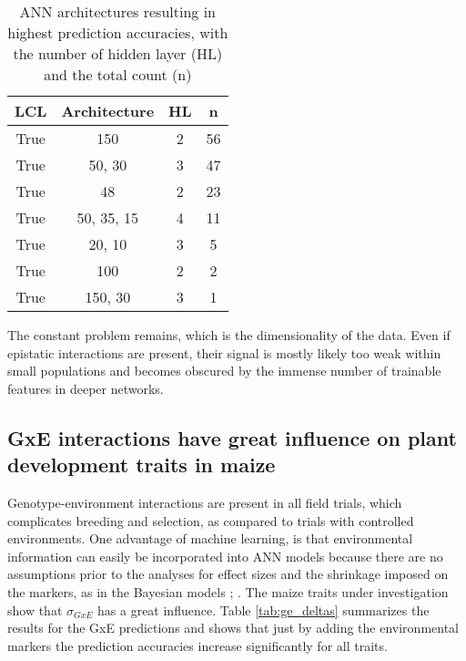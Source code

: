 \onehalfspacing
\begin{table}[H]
 \centering
 \caption[ANN architectures of ANN resulting in highest prediction accuracies]{ANN
   architectures resulting in highest prediction accuracies, with the number of hidden layer
   (HL) and the total count (n)}
 \begin{tabular}{cccc}
   \toprule
   LCL  & Architecture & HL & n  \\ 
   \midrule
   True & 150          & 2  & 56 \\ 
   True & 50, 30       & 3  & 47 \\ 
   True & 48           & 2  & 23 \\ 
   True & 50, 35, 15   & 4  & 11 \\ 
   True & 20, 10       & 3  & 5  \\ 
   True & 100          & 2  & 2  \\ 
   True & 150, 30      & 3  & 1  \\
   \bottomrule
 \end{tabular}
 \label{tab:ann_res}
\end{table}
\doublespacing

The constant problem remains, which is the dimensionality of the data. Even if epistatic
interactions are present, their signal is mostly likely too weak within small populations
and becomes obscured by the immense number of trainable features in deeper networks.

\subsection{GxE interactions have great influence on plant development traits in maize}

Genotype-environment interactions are present in all field trials, which complicates
breeding and selection, as compared to trials with controlled environments. One advantage
of machine learning, is that environmental information can easily be incorporated into ANN
models because there are no assumptions prior to the analyses for effect sizes and the
shrinkage imposed on the markers, as in the Bayesian models \cite{gianola2013};
\cite{bustos2016improvement}. The maize traits under investigation show that
$\sigma_{GxE}$ has a great influence. Table \ref{tab:ge_deltas} summarizes the results for
the GxE predictions and shows that just by adding the environmental markers the prediction
accuracies increase significantly for all traits.


